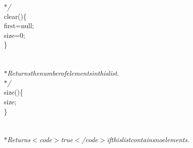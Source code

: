 {{\begin{tabbing}
{\it{\hspace{30pt}$\ast$/}}\\
\hspace{6pt}clear()\hspace{6pt}\{\\
\hspace{48pt}first\hspace{6pt}=\hspace{6pt}null;\\
\hspace{48pt}size\hspace{6pt}=\hspace{6pt}0;\\
\hspace{24pt}\}\\
\\
\hspace{24pt}{\it{/$\ast$$\ast$}}\\
{\it{\hspace{30pt}$\ast$\hspace{6pt}Returns\hspace{6pt}the\hspace{6pt}number\hspace{6pt}of\hspace{6pt}elements\hspace{6pt}in\hspace{6pt}this\hspace{6pt}list.}}\\
{\it{\hspace{30pt}$\ast$/}}\\
\hspace{6pt}size()\hspace{6pt}\{\\
\hspace{6pt}size;\\
\hspace{24pt}\}\\
\\
\hspace{24pt}{\it{/$\ast$$\ast$}}\\
{\it{\hspace{30pt}$\ast$\hspace{6pt}Returns\hspace{6pt}$<$code$>$true$<$/code$>$\hspace{6pt}if\hspace{6pt}this\hspace{6pt}list\hspace{6pt}contains\hspace{6pt}no\hspace{6pt}elements.}}\\

\end{tabbing}}}

